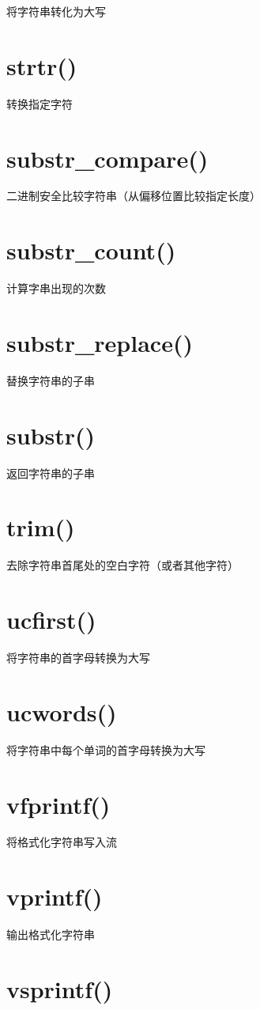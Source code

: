 将字符串转化为大写
\section{strtr()}

转换指定字符
\section{substr\_compare()}

二进制安全比较字符串（从偏移位置比较指定长度）
\section{substr\_count()}
计算字串出现的次数

\section{substr\_replace()}

替换字符串的子串
\section{substr()}
返回字符串的子串

\section{trim()}

去除字符串首尾处的空白字符（或者其他字符）
\section{ucfirst()}

将字符串的首字母转换为大写
\section{ucwords()}

将字符串中每个单词的首字母转换为大写
\section{vfprintf()}

将格式化字符串写入流
\section{vprintf()}

输出格式化字符串

\section{vsprintf()}

